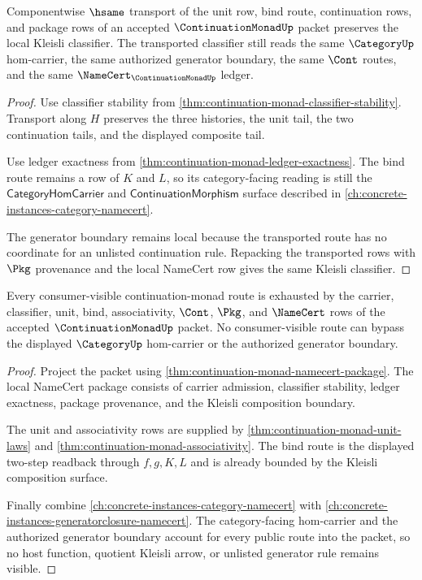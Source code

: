 \begin{theorem}
\label{thm:continuation-monad-bind-route-classifier-stability}
Componentwise $\hsame$ transport of the unit row, bind route, continuation rows, and package rows of an accepted $\ContinuationMonadUp$ packet preserves the local Kleisli classifier. The transported classifier still reads the same $\CategoryUp$ hom-carrier, the same authorized generator boundary, the same $\Cont$ routes, and the same $\NameCert_{\ContinuationMonadUp}$ ledger.
\end{theorem}
\begin{proof}
Use classifier stability from \autoref{thm:continuation-monad-classifier-stability}. Transport along $H$ preserves the three histories, the unit tail, the two continuation tails, and the displayed composite tail.

Use ledger exactness from \autoref{thm:continuation-monad-ledger-exactness}. The bind route remains a row of $K$ and $L$, so its category-facing reading is still the $\mathsf{CategoryHomCarrier}$ and $\mathsf{ContinuationMorphism}$ surface described in \autoref{ch:concrete-instances-category-namecert}.

The generator boundary remains local because the transported route has no coordinate for an unlisted continuation rule. Repacking the transported rows with $\Pkg$ provenance and the local NameCert row gives the same Kleisli classifier.
\end{proof}

\begin{theorem}
\label{thm:continuation-monad-namecert-ledger-exactness}
Every consumer-visible continuation-monad route is exhausted by the carrier, classifier, unit, bind, associativity, $\Cont$, $\Pkg$, and $\NameCert$ rows of the accepted $\ContinuationMonadUp$ packet. No consumer-visible route can bypass the displayed $\CategoryUp$ hom-carrier or the authorized generator boundary.
\end{theorem}
\begin{proof}
Project the packet using \autoref{thm:continuation-monad-namecert-package}. The local NameCert package consists of carrier admission, classifier stability, ledger exactness, package provenance, and the Kleisli composition boundary.

The unit and associativity rows are supplied by \autoref{thm:continuation-monad-unit-laws} and \autoref{thm:continuation-monad-associativity}. The bind route is the displayed two-step readback through $f,g,K,L$ and is already bounded by the Kleisli composition surface.

Finally combine \autoref{ch:concrete-instances-category-namecert} with \autoref{ch:concrete-instances-generatorclosure-namecert}. The category-facing hom-carrier and the authorized generator boundary account for every public route into the packet, so no host function, quotient Kleisli arrow, or unlisted generator rule remains visible.
\end{proof}

